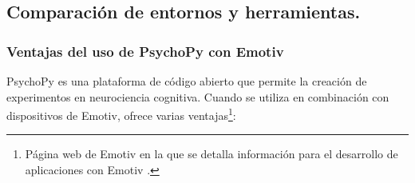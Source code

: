 \subsection{Comparación de entornos y herramientas.}

\subsubsection{Ventajas del uso de PsychoPy con Emotiv}
PsychoPy es una plataforma de código abierto que permite la creación de experimentos en neurociencia cognitiva. Cuando se utiliza en combinación con dispositivos de Emotiv, ofrece varias ventajas\cite{EMOTIVDevelopers}\footnote{Página web de Emotiv en la que se detalla información para el desarrollo de aplicaciones con Emotiv \cite{EMOTIVDevelopers}.}:


